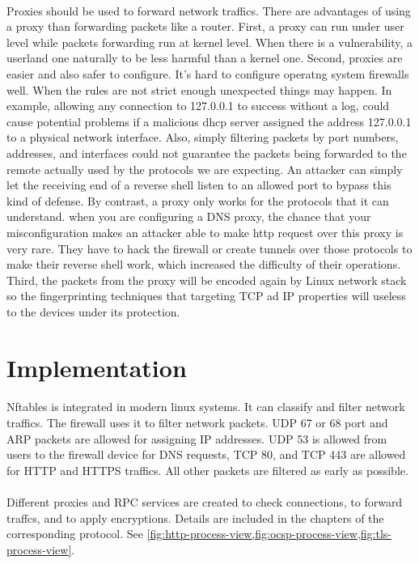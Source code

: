 \documentclass[mscthesis]{usiinfthesis}
\begin{document}
\paragraph{}
Proxies should be used to forward network traffics. There are advantages of using a proxy than forwarding packets like a router. First, a proxy can run under user level while packets forwarding run at kernel level. When there is a vulnerability, a userland one naturally to be less harmful than a kernel one. Second, proxies are easier and also safer to configure. It's hard to configure operatng system firewalls well. When the rules are not strict enough unexpected things may happen. In example, allowing any connection to 127.0.0.1 to success without a log, could cause potential problems if a malicious dhcp server assigned the address 127.0.0.1 to a physical network interface. Also, simply filtering packets by port numbers, addresses, and interfaces could not guarantee the packets being forwarded to the remote actually used by the protocols we are expecting. An attacker can simply let the receiving end of a reverse shell listen to an allowed port to bypass this kind of defense. By contrast, a proxy only works for the protocols that it can understand. when you are configuring a DNS proxy, the chance that your misconfiguration makes an attacker able to make http request over this proxy is very rare. They have to hack the firewall or create tunnels over those protocols to make their reverse shell work, which increased the difficulty of their operations. Third, the packets from the proxy will be encoded again by Linux network stack so the fingerprinting techniques that targeting TCP ad IP properties will useless to the devices under its protection.

\section{Implementation}
\paragraph{}
Nftables is integrated in modern linux systems. It can classify and filter network traffics. The firewall uses it to filter network packets. UDP 67 or 68 port and ARP packets are allowed for assigning IP addresses. UDP 53 is allowed from users to the firewall device for DNS requests, TCP 80, and TCP 443 are allowed for HTTP and HTTPS traffics. All other packets are filtered as early as possible.
\paragraph{}
Different proxies and RPC services are created to check connections, to forward traffcs, and to apply encryptions. Details are included in the chapters of the corresponding protocol. See \cref{fig:http-process-view,fig:ocsp-process-view,fig:tls-process-view}.
\end{document}
